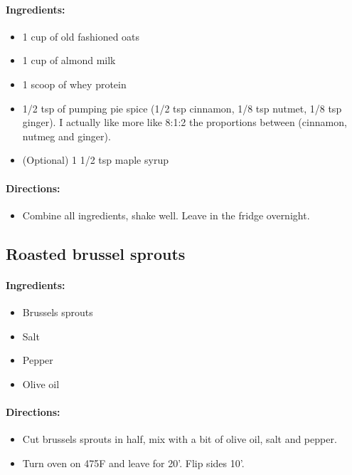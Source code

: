 \documentclass{article}
\begin{document}
\paragraph{Ingredients:}

\begin{itemize}
	\item 1 cup of old fashioned oats
	\item 1 cup of almond milk
	\item 1 scoop of whey protein
	\item 1/2 tsp of pumping pie spice (1/2 tsp cinnamon, 1/8 tsp nutmet, 1/8 tsp ginger). I actually like more like 8:1:2 the proportions between (cinnamon, nutmeg and ginger).
	\item (Optional) 1 1/2 tsp maple syrup
\end{itemize}

\paragraph{Directions:}
\begin{itemize}
	\item Combine all ingredients, shake well. Leave in the fridge overnight.
\end{itemize}

\subsection{Roasted brussel sprouts}

\paragraph{Ingredients:}

\begin{itemize}
	\item Brussels sprouts
	\item Salt
	\item Pepper
	\item Olive oil
\end{itemize}

\paragraph{Directions:}
\begin{itemize}
	\item Cut brussels sprouts in half, mix with a bit of olive oil, salt and pepper.
	\item Turn oven on 475F and leave for 20'. Flip sides 10'.
\end{itemize}
\end{document}
